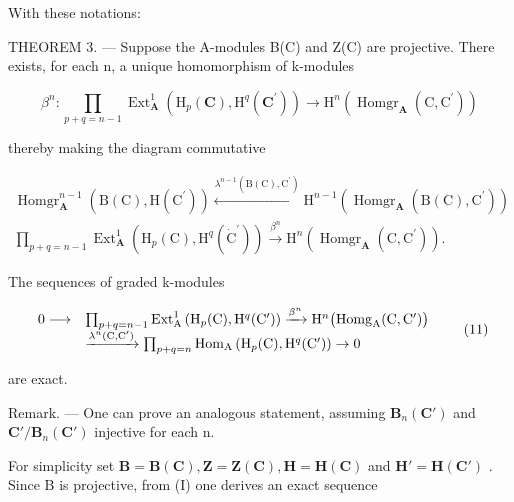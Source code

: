 With these notations:

THEOREM 3. --- Suppose the A-modules B(C) and Z(C) are projective. There exists, for each n, a unique homomorphism of k-modules

\[
\beta^ {n}: \prod_ {p + q = n - 1} \operatorname{Ext} _ {\mathbf {A}} ^ {1} \left(\mathrm{H} _ {p} (\mathbf {C}), \mathrm{H} ^ {q} \left(\mathbf {C} ^ {\prime}\right)\right)\rightarrow \mathrm{H} ^ {n} \left(\operatorname{Homgr} _ {\mathbf {A}} \left(\mathrm{C}, \mathrm{C} ^ {\prime}\right)\right)
\]

thereby making the diagram commutative

\[
\begin{array}{c} \operatorname{Homgr} _ {\mathbf {A}} ^ {n - 1} (\mathrm{B} (\mathrm{C}), \mathrm{H} (\mathrm{C} ^ {\prime})) \xleftarrow {\lambda^ {n - 1} (\mathrm{B} (\mathrm{C}) , \mathrm{C} ^ {\prime})} \mathrm{H} ^ {n - 1} (\operatorname{Homgr} _ {\mathbf {A}} (\mathrm{B} (\mathrm{C}), \mathrm{C} ^ {\prime})) \\ \prod_ {p + q = n - 1} \operatorname{Ext} _ {\mathbf {A}} ^ {1} (\mathrm{H} _ {p} (\mathrm{C}), \mathrm{H} ^ {q} (\dot {\mathrm{C}} ^ {\prime})) \xrightarrow {\beta^ {n}} \mathrm{H} ^ {n} (\operatorname{Homgr} _ {\mathbf {A}} (\mathrm{C}, \mathrm{C} ^ {\prime})). \end{array}
\]

The sequences of graded k-modules

\[
\begin{array}{r l} 0 \longrightarrow & \prod_ {p + q = n - 1} \operatorname{Ext} _ {\mathrm{A}} ^ {1} \left(\mathrm{H} _ {p} (\mathrm{C}), \mathrm{H} ^ {q} (\mathrm{C} ^ {\prime})\right) \xrightarrow {\beta^ {n}} \mathrm{H} ^ {n} \big (\mathrm{Homg} _ {\mathrm{A}} (\mathrm{C}, \mathrm{C} ^ {\prime}) \big) \\ & \xrightarrow {\lambda^ {n} (\mathrm{C} , \mathrm{C} ^ {\prime})} \prod_ {p + q = n} \mathrm{Hom} _ {\mathrm{A}} \left(\mathrm{H} _ {p} (\mathrm{C}), \mathrm{H} ^ {q} (\mathrm{C} ^ {\prime})\right) \to 0 \end{array}\tag{11}
\]

are exact.

Remark. --- One can prove an analogous statement, assuming \(\mathbf{B}_{n}(\mathbf{C}')\) and \(\mathbf{C}'/\mathbf{B}_{n}(\mathbf{C}')\) injective for each n.

For simplicity set \(\mathbf{B} = \mathbf{B}(\mathbf{C}), \mathbf{Z} = \mathbf{Z}(\mathbf{C}), \mathbf{H} = \mathbf{H}(\mathbf{C})\) and \(\mathbf{H}' = \mathbf{H}(\mathbf{C}')\) . Since B is projective, from (I) one derives an exact sequence

